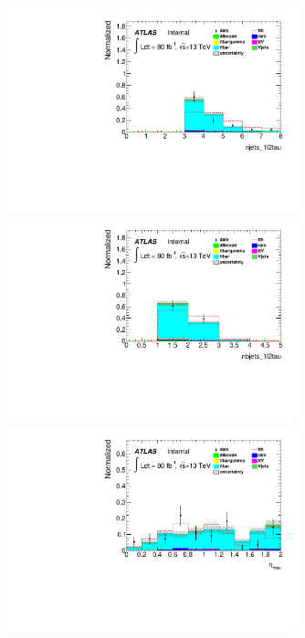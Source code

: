 \begin{figure}[htp]
\begin{minipage}[t]{0.33\linewidth}
\centering
\includegraphics[width=0.75\textwidth,angle=-90]{fig/OneL2tauSSnoBDT_norm/njets_1l2tau_F.pdf}
\end{minipage}
\begin{minipage}[t]{0.33\linewidth}
\centering
\includegraphics[width=0.75\textwidth,angle=-90]{fig/OneL2tauSSnoBDT_norm/nbjets_1l2tau_F.pdf}
\end{minipage}
\begin{minipage}[t]{0.33\linewidth}
\centering
\includegraphics[width=0.75\textwidth,angle=-90]{fig/OneL2tauSSnoBDT_norm/maxeta_F.pdf}

\end{minipage}
\end{figure}
